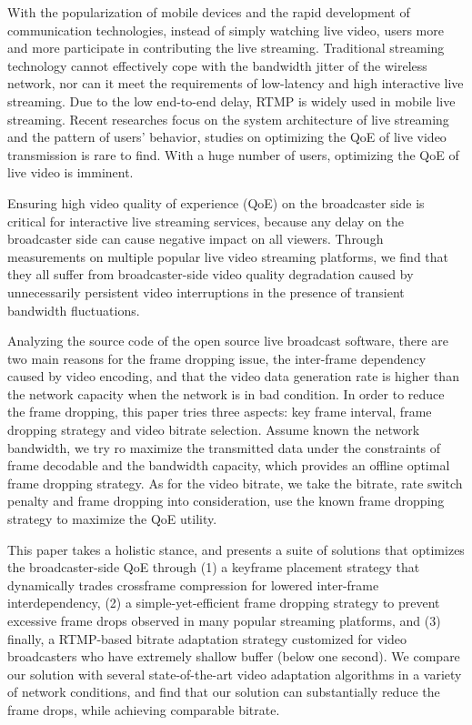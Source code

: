 \begin{eabstract}
With the popularization of mobile devices and the rapid development of communication technologies, instead of simply watching live video, users more and more participate in contributing the live streaming. Traditional streaming technology cannot effectively cope with the bandwidth jitter of the wireless network, nor can it meet the requirements of low-latency and high interactive live streaming. Due to the low end-to-end delay, RTMP is widely used in mobile live streaming. Recent researches focus on the system architecture of live streaming and the pattern of users' behavior, studies on optimizing the QoE of live video transmission is rare to find. With a huge number of users, optimizing the QoE of live video is imminent.

Ensuring high video quality of experience (QoE) on the
broadcaster side is critical for interactive live streaming
services, because any delay on the broadcaster side can cause
negative impact on all viewers. Through measurements on
multiple popular live video streaming platforms, we find that
they all suffer from broadcaster-side video quality degradation
caused by unnecessarily persistent video interruptions
in the presence of transient bandwidth fluctuations. 

Analyzing the source code of the open source live broadcast software, there are two main reasons for the frame dropping issue, the inter-frame dependency caused by video encoding, and that the video data generation rate is higher than the network capacity when the network is in bad condition. In order to reduce the frame dropping, this paper tries three aspects: key frame interval, frame dropping strategy and video bitrate selection. Assume known the network bandwidth, we try ro maximize the transmitted data under the constraints of frame decodable and the bandwidth capacity, which provides an offline optimal frame dropping strategy. As for the video bitrate, we take the bitrate, rate switch penalty and frame dropping into consideration, use the known frame dropping strategy to maximize the QoE utility.

This paper takes a holistic stance, and presents a suite of
solutions that optimizes the broadcaster-side QoE through (1)
a keyframe placement strategy that dynamically trades crossframe
compression for lowered inter-frame interdependency,
(2) a simple-yet-efficient frame dropping strategy to prevent
excessive frame drops observed in many popular streaming
platforms, and (3) finally, a RTMP-based bitrate adaptation
strategy customized for video broadcasters who have extremely
shallow buffer (below one second). We compare our solution with several state-of-the-art video adaptation algorithms in a variety of network conditions, and find
that our solution can substantially reduce the frame drops, while achieving comparable
bitrate.
\end{eabstract}

